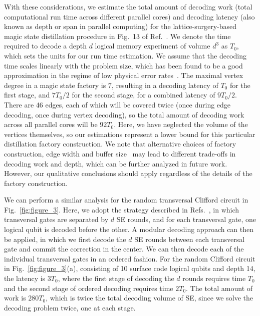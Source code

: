 \documentclass[prx,twocolumn,secnumarabic,balancelastpage,amsmath,amssymb,longbibliography]{revtex4-2}
\begin{document}
With these considerations, we estimate the total amount of decoding work (total computational run time across different parallel cores) and decoding latency (also known as depth or span in parallel computing) for the lattice-surgery-based magic state distillation procedure in Fig.~13 of Ref.~\cite{bombin2023modular}.
%
We denote the time required to decode a depth $d$ logical memory experiment of volume $d^3$ as $T_0$, which sets the units for our run time estimation.
%
We assume that the decoding time scales linearly with the problem size, which has been found to be a good approximation in the regime of low physical error rates~\cite{higgott2025sparse,wu2023fusion}.
%
The maximal vertex degree in a magic state factory is 7, resulting in a decoding latency of $T_0$ for the first stage, and $7T_0/2$ for the second stage, for a combined latency of $9T_0/2$.
%
There are 46 edges, each of which will be covered twice (once during edge decoding, once during vertex decoding), so the total amount of decoding work across all parallel cores will be $92T_0$.
%
Here, we have neglected the volume of the vertices themselves, so our estimations represent a lower bound for this particular distillation factory construction.
%
We note that alternative choices of factory construction, edge width and buffer size~\cite{fowler2018low,gidney2019efficient} may lead to different trade-offs in decoding work and depth, which can be further analyzed in future work.
%
However, our qualitative conclusions should apply regardless of the details of the factory construction.

We can perform a similar analysis for the random transversal Clifford circuit in Fig.~\ref{fig:figure_3}.
%
Here, we adopt the strategy described in Refs.~\cite{sahay2024error,wan2024iterative,beverland2021cost}, in which transversal gates are separated by $d$ SE rounds, and for each transversal gate, one logical qubit is decoded before the other.
%
A modular decoding approach can then be applied, in which we first decode the $d$ SE rounds between each transversal gate and commit the correction in the center.
%
We can then decode each of the individual transversal gates in an ordered fashion.
%
For the random Clifford circuit in Fig.~\ref{fig:figure_3}(a), consisting of 10 surface code logical qubits and depth 14, the latency is $3T_0$, where the first stage of decoding the $d$ rounds requires time $T_0$ and the second stage of ordered decoding requires time $2T_0$.
%
The total amount of work is $280T_0$, which is twice the total decoding volume of SE, since we solve the decoding problem twice, one at each stage.


\end{document}
